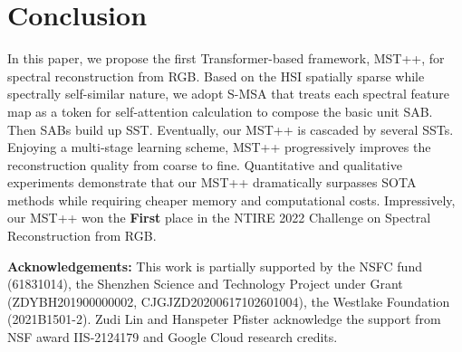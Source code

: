 \documentclass[10pt,twocolumn,letterpaper]{article}
\begin{document}
\section{Conclusion}
In this paper, we propose the first Transformer-based framework, MST++, for spectral reconstruction from RGB. Based on the HSI spatially sparse while spectrally self-similar nature, we adopt S-MSA that treats each spectral feature map as a token for self-attention calculation to compose the basic unit SAB. Then SABs build up SST. Eventually, our MST++ is cascaded by several SSTs. Enjoying a multi-stage learning scheme, MST++ progressively improves the reconstruction quality from coarse to fine. Quantitative and qualitative experiments demonstrate that our MST++ dramatically  surpasses  SOTA methods while requiring cheaper memory and computational costs. Impressively, our MST++ won the \textbf{First} place in the NTIRE 2022 Challenge on Spectral Reconstruction from RGB.

\vspace{2mm}
\noindent \textbf{Acknowledgements:} This work is partially supported by the NSFC fund (61831014), the Shenzhen Science and Technology Project under Grant (ZDYBH201900000002, CJGJZD20200617102601004), the Westlake Foundation (2021B1501-2). Zudi Lin and Hanspeter Pfister acknowledge the support from NSF award IIS-2124179 and Google Cloud research credits.


{\small


}
\end{document}
